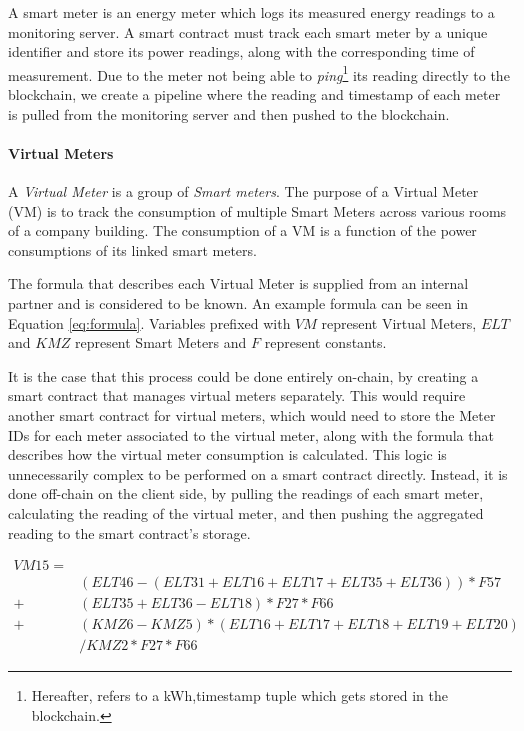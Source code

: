 A smart meter is an energy meter which logs its measured energy readings to a monitoring server. A smart contract must track each smart meter by a unique identifier and store its power readings, along with the corresponding time of measurement. Due to the meter not being able to \textit{ping}\footnote{Hereafter, refers to a kWh,timestamp tuple which gets stored in the blockchain.} its reading directly to the blockchain, we create a pipeline where the reading and timestamp of each meter is pulled from the monitoring server and then pushed to the blockchain. 



\paragraph{Virtual Meters}

A \textit{Virtual Meter} is a group of \textit{Smart meters}. The purpose of a Virtual Meter (VM) is to track the consumption of multiple Smart Meters across various rooms of a company building. The consumption of a VM is a function of the power consumptions of its linked smart meters. 

The formula that describes each Virtual Meter is supplied from an internal partner and is considered to be known. An example formula can be seen in Equation \ref{eq:formula}. Variables prefixed with $VM$ represent Virtual Meters, $ELT$ and $KMZ$ represent Smart Meters and $F$ represent constants.

It is the case that this process could be done entirely on-chain, by creating a smart contract that manages virtual meters separately. This would require another smart contract for virtual meters, which would need to store the Meter IDs for each meter associated to the virtual meter, along with the formula that describes how the virtual meter consumption is calculated. This logic is unnecessarily complex to be performed on a smart contract directly. Instead, it is done off-chain on the client side, by pulling the readings of each smart meter, calculating the reading of the virtual meter, and then pushing the aggregated reading to the smart contract's storage.

\begin{equation} \label{eq:formula}
    \begin{aligned}
        VM15= \\
        & (ELT46-(ELT31+ELT16+ELT17+ELT35+ELT36))*F57
        \\
        + & (ELT35+ELT36-ELT18)*F27*F66
        \\
        + & (KMZ6-KMZ5)*(ELT16+ELT17+ELT18+ELT19+ELT20)\\
        & /KMZ2*F27*F66 
    \end{aligned}
\end{equation}

